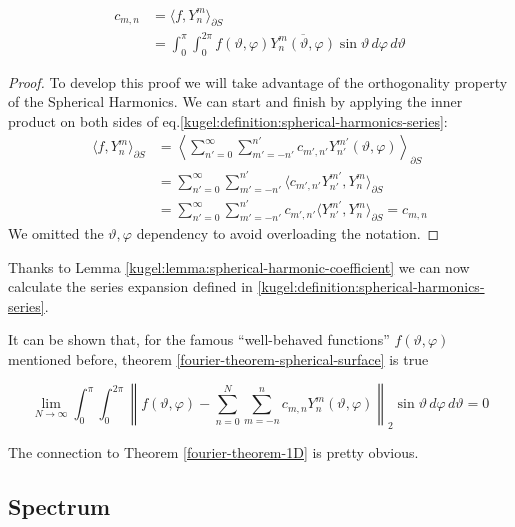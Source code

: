 \begin{lemma}
  \label{kugel:lemma:spherical-harmonic-coefficient}
  \begin{align*}
    c_{m,n} 
    &= \langle f, Y^m_n \rangle_{\partial S} \\
    &= \int_0^\pi \int_0^{2\pi} f(\vartheta,\varphi) \overline{Y^m_n(\vartheta,\varphi)} \sin\vartheta \,d\varphi\,d\vartheta
  \end{align*}
\end{lemma}
\begin{proof}
  To develop this proof we will take advantage of the orthogonality property of the Spherical Harmonics. We can start and finish by applying the inner product on both sides of eq.\eqref{kugel:definition:spherical-harmonics-series}:
  \begin{align*}
    \langle f, Y^{m}_{n} \rangle_{\partial S}
    &= \left\langle \sum_{n'=0}^\infty \sum_{m' =-n'}^{n'}
      c_{m',n'} Y^{m'}_{n'}(\vartheta, \varphi) \right\rangle_{\partial S}  \\
    &=  \sum_{n'=0}^\infty \sum_{m' =-n'}^{n'}
      \langle c_{m',n'} Y^{m'}_{n'}, Y^{m}_{n} \rangle_{\partial S} \\
      &= \sum_{n'=0}^\infty \sum_{m' =-n'}^{n'} c_{m',n'} \langle Y^{m'}_{n'}, Y^{m}_{n} \rangle_{\partial S} = c_{m,n}
  \end{align*}
  We omitted the $\vartheta, \varphi$ dependency to avoid overloading the notation.
\end{proof}
Thanks to Lemma \ref{kugel:lemma:spherical-harmonic-coefficient} we can now calculate the series expansion defined in \ref{kugel:definition:spherical-harmonics-series}.

It can be shown that, for the famous ``well-behaved functions'' $f(\vartheta, \varphi)$ mentioned before, theorem \ref{fourier-theorem-spherical-surface} is true
\begin{theorem}
  \label{fourier-theorem-spherical-surface}
  \begin{equation*}
    \lim_{N \to \infty} 
    \int_0^\pi \int_0^{2\pi} \left\| f(\vartheta,\varphi) - \sum_{n=0}^N\sum_{m=-n}^n c_{m,n} Y^m_n(\vartheta,\varphi)
    \right\|_2 \sin\vartheta \,d\varphi\,d\vartheta  = 0
  \end{equation*}
\end{theorem}
The connection to Theorem \ref{fourier-theorem-1D} is pretty obvious.

\subsection{Spectrum}

